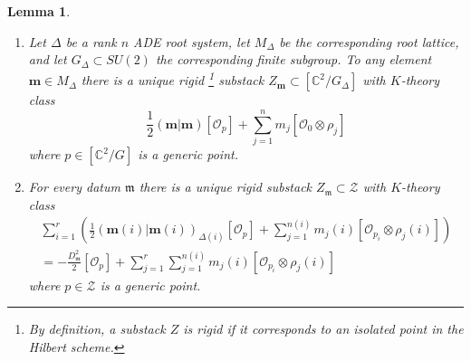 \documentclass{amsart}
\newtheorem{lemma}[theorem]{Lemma}
\theoremstyle{definition}
\newcommand{\half}{\frac{1}{2}}
\newcommand{\mdata}{\mathfrak{m}}
\renewcommand{\O}{\mathcal{O}}
\newcommand{\Zcal}{\mathcal{Z}}
\newcommand{\mvec}{\bm{m}}
\begin{document}
\begin{lemma}
\label{lem:rigidsh} $\quad$

	\begin{enumerate} \item Let $\Delta$ be a rank $n$ ADE root
system, let $M_{\Delta }$ be the corresponding root lattice, and let
$G_{\Delta } \subset SU(2)$ the corresponding finite subgroup. To any
element $\mvec \in M_{\Delta }$ there is a unique rigid
\footnote{By
definition, a substack $Z$ is \emph{rigid} if it corresponds to an
isolated point in the Hilbert scheme. }
substack $Z_{\mvec}\subset [\mathbb{C}^2/G_{\Delta}]$ with $K$-theory
class
\[
\half (\mvec|\mvec)[\O_{p}] + \sum_{j=1}^{n}
m_{j}[\O_{0}\otimes \rho_{j}]
\]
where $p \in [\mathbb{C}^2/G]$ is a generic point.
	
		\item For every datum $\mdata$ there is a unique rigid
substack $Z_{\mdata} \subset \mathcal{Z}$ with $K$-theory
class \begin{gather*}\sum_{i=1}^r
\left(
\frac{1}{2}(\mvec(i)|\mvec(i))_{\Delta (i)}[\O_{p}] + \sum_{j=1}^{n(i)}
m_{j}(i)[\O_{p_i}\otimes \rho_{j}(i)]
 \right)\\
=-\frac{
D_{\mdata}^{2}}{2}[\O_{p}] +\sum_{j=1}^{r} \sum_{j=1}^{n(i)} m_{j}(i)[\O_{p_i}\otimes
\rho_{j}(i)] \end{gather*} where $p \in \Zcal$ is a generic point.
	\end{enumerate}
\end{lemma}
\end{document}
